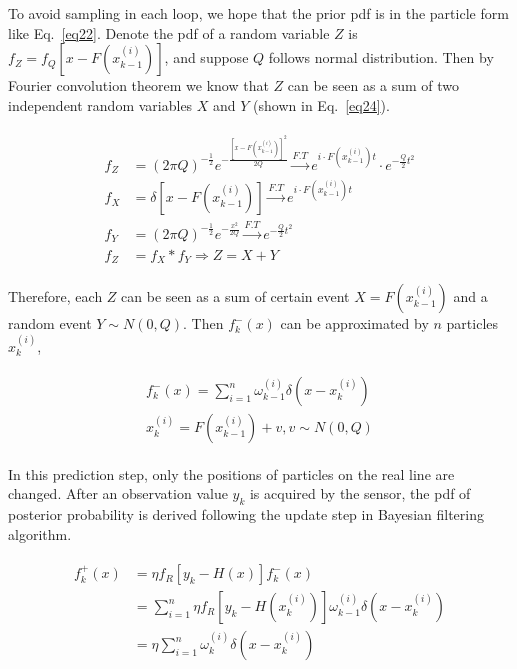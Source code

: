 \documentclass[conference]{IEEEtran}
\begin{document}
	To avoid sampling in each loop, we hope that the prior pdf is in the particle form like Eq.~\ref{eq22}. Denote the pdf of a random variable $Z$ is $f_{Z}=f_{Q}[x-F(x_{k-1}^{(i)})]$, and suppose $Q$ follows normal distribution. Then by Fourier convolution theorem we know that $Z$ can be seen as a sum of two independent random variables $X$ and $Y$ (shown in Eq.~\ref{eq24}).
	
	
	\begin{equation}
	\begin{split}
	\begin{aligned}
	f_{Z}&=(2\pi Q)^{-\frac{1}{2}}e^{-\frac{[x-F(x_{k-1}^{(i)})]^{2}}{2Q}}\overset{F.T}{\rightarrow}e^{i \cdot F(x_{k-1}^{(i)})t}\cdot e^{-\frac{Q}{2}t^{2}}\\
	f_{X}&=\delta [x-F(x_{k-1}^{(i)})]\overset{F.T}{\rightarrow}e^{i \cdot F(x_{k-1}^{(i)})t}\\
	f_{Y}&=(2\pi Q)^{-\frac{1}{2}}e^{-\frac{x^{2}}{2Q}}\overset{F.T}{\rightarrow}e^{-\frac{Q}{2}t^{2}}\\
	f_{Z}&=f_{X}\ast f_{Y}\Rightarrow Z=X+Y
	\label{eq24}
	\end{aligned}
	\end{split}
	\end{equation}
	
	Therefore, each $Z$ can be seen as a sum of certain event $X=F(x_{k-1}^{(i)})$ and a random event $Y\sim N(0,Q)$. Then $f_{k}^{-}(x)$ can be approximated by $n$ particles $x_{k}^{(i)}$, 
	
	\begin{equation}
	\begin{split}
	\begin{aligned}
	f_{k}^{-}(x)=\sum_{i=1}^{n}\omega_{k-1}^{(i)}\delta (x-x_{k}^{(i)})\\
	x_{k}^{(i)}=F(x_{k-1}^{(i)})+v, v\sim N(0,Q)
	\label{eq25}
	\end{aligned}
	\end{split}
	\end{equation}
	
	In this prediction step, only the positions of particles on the real line are changed. After an observation value $y_{k}$ is acquired by the sensor, the pdf of posterior probability is derived following the update step in Bayesian filtering algorithm.
	
	\begin{equation}
	\begin{split}
	\begin{aligned}
	f_{k}^{+}(x)&=\eta f_{R}[y_{k}-H(x)]f_{k}^{-}(x)\\
	&=\sum_{i=1}^{n}\eta f_{R}[y_{k}-H(x_{k}^{(i)})]\omega_{k-1}^{(i)}\delta (x-x_{k}^{(i)})\\
	&=\eta \sum_{i=1}^{n}\omega_{k}^{(i)}\delta (x-x_{k}^{(i)})
	\label{eq26}
	\end{aligned}
	\end{split}
	\end{equation}
	
\end{document}
